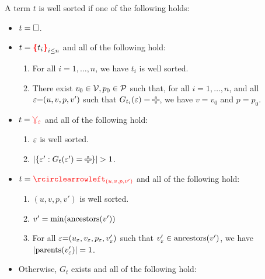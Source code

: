 \begin{definition}
  A term $t$ is well sorted if one of the following holds:
  \begin{itemize}
    \item $t = \square$.
    \item $t = \conflictHole{t_i}_{i \leq n}$ and all of the following hold:
      \begin{enumerate}
        \item For all $i = 1, \ldots, n$, we have $t_i$ is well sorted.
        \item
          There exist $v_0 \in \mathcal{V}, p_0 \in \mathcal{P}$ such that,
          for all $i = 1, \ldots, n$,
          and all $\varepsilon{=}(u, v, p, v')$ such that $G_{t_i}(\e) = \Plus$,
          we have $v = v_0$ and $p = p_0$.
      \end{enumerate}
    \item $t = \textcolor{red}{\curlyveedownarrow_{\varepsilon}}$ and all of the following hold:
      \begin{enumerate}
        \item $\varepsilon$ is well sorted.
        \item $\SizeOf{\SetOf{\e' \SuchThat{G_t(\e') = \Plus}}} > 1$.
      \end{enumerate}
    \item $t = \cycleVertex{(u, v, p, v')}$ and all of the following hold:
      \begin{enumerate}
        \item $(u, v, p, v')$ is well sorted.
        \item $v' = \operatorname{\text{min}}\mathopen{}\left(\operatorname{\text{ancestors}}\mathopen{}\left(v'\right)\mathclose{}\right)\mathclose{}$
        \item For all $\varepsilon{=}(u_{\varepsilon}, v_{\varepsilon}, p_{\varepsilon}, v_{\varepsilon}')$
          such that $v_{\varepsilon}' \in \operatorname{\text{ancestors}}\mathopen{}\left(v'\right)\mathclose{}$,
          we have $\left\lvert\operatorname{\text{parents}}\mathopen{}\left(v_{\varepsilon}'\right)\mathclose{}\right\rvert = 1$.
      \end{enumerate}
    \item Otherwise, $G_t$ exists and all of the following hold:
      \begin{enumerate}

\end{enumerate}
\end{itemize}
\end{definition}
